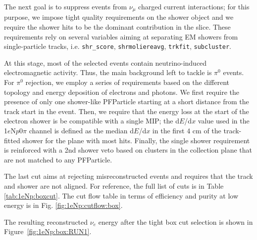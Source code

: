 \documentclass[a4paper]{article}
\newcommand{\nue}{$\nu_e$\xspace}
\newcommand{\npsel}{1$e$N$p$0$\pi$\xspace}
\newcommand{\dedx}{d$E$/d$x$\xspace}
\begin{document}
The next goal is to suppress events from $\nu_\mu$ charged current interactions; for this purpose, we impose tight quality requirements on the shower object and we require the shower hits to be the dominant contribution in the slice. These requirements rely on several variables aiming at separating EM showers from single-particle tracks, i.e. \texttt{shr\_score}, \texttt{shrmoliereavg}, \texttt{trkfit}, \texttt{subcluster}. 

At this stage, most of the selected events contain neutrino-induced electromagnetic activity. Thus, the main background left to tackle is  $\pi^0$ events. For $\pi^0$ rejection, we employ a series of requirements based on the different topology and energy deposition of electrons and photons. We first require the presence of only one shower-like PFParticle starting at a short distance from the track start in the event. Then, we require that the energy loss at the start of the electron shower is be compatible with a single MIP; the \dedx  value used in the \npsel channel is defined as the median \dedx in the first 4 cm of the track-fitted shower for the plane with most hits. Finally, the single shower requirement is reinforced with a 2nd shower veto based on clusters in the collection plane that are not matched to any PFParticle.

The last cut aims at rejecting misreconstructed events and requires that the track and shower are not aligned. For reference, the full list of cuts is in Table \ref{tab:1eNp:boxcut}. The cut flow table in terms of efficiency and purity at low energy is in Fig. \ref{fig:1eNp:cutflow:box}.

The resulting reconstructed \nue energy after the tight box cut selection is shown in Figure~\ref{fig:1eNp:box:RUN1}.
\end{document}
